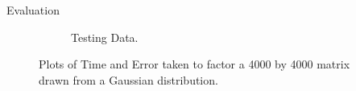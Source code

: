 \documentclass[final]{beamer}
\begin{document}
{\begin{frame}{}
\begin{center}
\begin{columns}[t]
\begin{column}{0.32\textwidth}
\begin{block}{\huge Evaluation}
\begin{itemize}
{\begin{figure}
\begin{subfigure}[b]{.45\textwidth}
\begin{center}
		\caption{Testing Data.}
\end{center}
	\end{subfigure}
\hfill
	\caption{Plots of Time and Error taken to factor a 4000 by 4000 matrix drawn from a Gaussian distribution.}	
\end{figure}

}
\end{itemize}
\end{block}
\end{column}
\end{columns}
\end{center}
\end{frame}}
\end{document}
